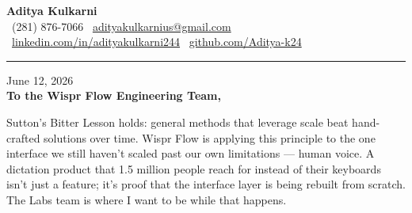 \documentclass[11pt,letterpaper]{article}
\begin{document}
\begin{center}
    {\Huge \textbf{\color{WisprNavy} Aditya Kulkarni}}\\[8pt]
    {\color{DarkGrey} \small
    \faPhone \ (281) 876-7066 \quad \textbar \quad
    \faEnvelope \ \href{mailto:adityakulkarnius@gmail.com}{adityakulkarnius@gmail.com} \\[4pt]
    \faLinkedin \ \href{https://linkedin.com/in/adityakulkarni244}{linkedin.com/in/adityakulkarni244} \quad \textbar \quad
    \faGithub \ \href{https://github.com/Aditya-k24}{github.com/Aditya-k24}
    }
\end{center}

\vspace{-4pt}
{\color{WisprNavy}\rule{\linewidth}{1.5pt}}
\vspace{10pt}

June 12, 2026\\[10pt]
\textbf{To the Wispr Flow Engineering Team,}

\vspace{6pt}

Sutton's Bitter Lesson holds: general methods that leverage scale beat hand-crafted solutions over time. Wispr Flow is applying this principle to the one interface we still haven't scaled past our own limitations --- human voice. A dictation product that 1.5 million people reach for instead of their keyboards isn't just a feature; it's proof that the interface layer is being rebuilt from scratch. The Labs team is where I want to be while that happens.

\vspace{4pt}
\end{document}
